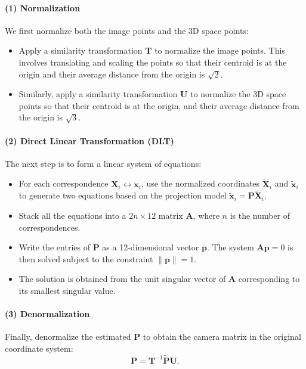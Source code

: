 \documentclass[12pt]{article}
\begin{document}
\paragraph{(1) Normalization}
We first normalize both the image points and the 3D space points:
\begin{itemize}
    \item Apply a similarity transformation \( \mathbf{T} \) to normalize the image points. This involves translating and scaling the points so that their centroid is at the origin and their average distance from the origin is \(\sqrt{2}\).
    \item Similarly, apply a similarity transformation \( \mathbf{U} \) to normalize the 3D space points so that their centroid is at the origin, and their average distance from the origin is \(\sqrt{3}\).
\end{itemize}

\paragraph{(2) Direct Linear Transformation (DLT)}
The next step is to form a linear system of equations:
\begin{itemize}
    \item For each correspondence \( \mathbf{X}_i \leftrightarrow \mathbf{x}_i \), use the normalized coordinates \( \tilde{\mathbf{X}}_i \) and \( \tilde{\mathbf{x}}_i \) to generate two equations based on the projection model \( \tilde{\mathbf{x}}_i = \mathbf{P} \tilde{\mathbf{X}}_i \).
    \item Stack all the equations into a \( 2n \times 12 \) matrix \( \mathbf{A} \), where \( n \) is the number of correspondences.
    \item Write the entries of \( \mathbf{P} \) as a 12-dimensional vector \( \mathbf{p} \). The system \( \mathbf{A} \mathbf{p} = 0 \) is then solved subject to the constraint \( \| \mathbf{p} \| = 1 \).
    \item The solution is obtained from the unit singular vector of \( \mathbf{A} \) corresponding to its smallest singular value.
\end{itemize}

\paragraph{(3) Denormalization}
Finally, denormalize the estimated \( \mathbf{P} \) to obtain the camera matrix in the original coordinate system:
$$
\mathbf{P} = \mathbf{T}^{-1} \tilde{\mathbf{P}} \mathbf{U}.
$$
\end{document}
